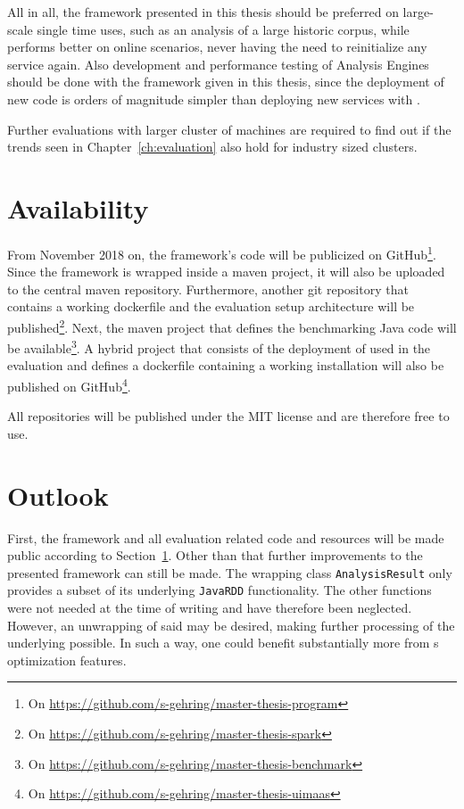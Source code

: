 All in all, the framework presented in this thesis should be preferred on large-scale single time uses, such as an analysis of a large historic corpus, while \uimaas{} performs better on online scenarios, never having the need to reinitialize any service again. Also development and performance testing of Analysis Engines should be done with the framework given in this thesis, since the deployment of new code is orders of magnitude simpler than deploying new services with \uimaas{}.

Further evaluations with larger cluster of machines are required to find out if the trends seen in Chapter~\ref{ch:evaluation} also hold for industry sized \spark{} clusters. 
\section{Availability}
\label{sec:availability}
From November 2018 on, the framework's code will be publicized on GitHub\footnote{On \url{https://github.com/s-gehring/master-thesis-program}}. Since the framework is wrapped inside a maven project, it will also be uploaded to the central maven repository. Furthermore, another git repository that contains a working \spark{} dockerfile and the evaluation setup architecture will be published\footnote{On \url{https://github.com/s-gehring/master-thesis-spark}}. Next, the maven project that defines the benchmarking Java code will be available\footnote{On \url{https://github.com/s-gehring/master-thesis-benchmark}}. A hybrid project that consists of the deployment of \uimaas{} used in the evaluation and defines a dockerfile containing a working \uimaas{} installation will also be published on GitHub\footnote{On \url{https://github.com/s-gehring/master-thesis-uimaas}}. 

All repositories will be published under the MIT license and are therefore free to use.

\section{Outlook}
\label{sec:outlook}
First, the framework and all evaluation related code and resources will be made public according to Section~\ref{sec:availability}. Other than that further improvements to the presented framework can still be made. The wrapping class \lstinline|AnalysisResult| only provides a subset of its underlying \lstinline|JavaRDD| functionality. The other functions were not needed at the time of writing and have therefore been neglected. However, an unwrapping of said \rdd{} may be desired, making further processing of the underlying \cas{} possible. In such a way, one could benefit substantially more from \spark{}s optimization features.


